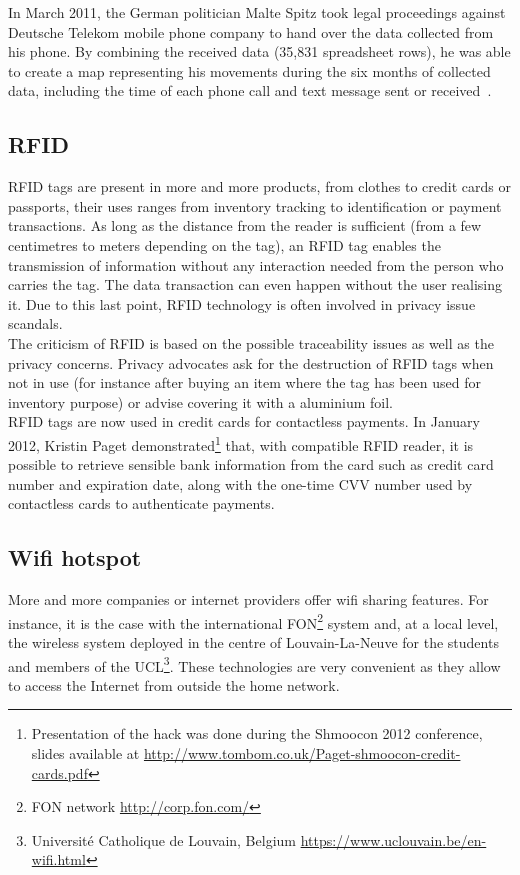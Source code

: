 In March 2011, the German politician Malte Spitz took legal proceedings against Deutsche Telekom mobile phone company to hand over the data collected from his phone.
By combining the received data (35,831 spreadsheet rows), he was able to create a map representing his movements during the six months of collected data, including the time of each phone call and text message sent or received~\cite{german-phone-tracking}.

\subsection*{RFID}

RFID tags are present in more and more products, from clothes to credit cards or passports, their uses ranges from inventory tracking to identification or payment transactions.
As long as the distance from the reader is sufficient (from a few centimetres to meters depending on the tag), an RFID tag enables the transmission of information without any interaction needed from the person who carries the tag.
The data transaction can even happen without the user realising it.
Due to this last point, RFID technology is often involved in privacy issue scandals.\\

The criticism of RFID is based on the possible traceability issues as well as the privacy concerns.
Privacy advocates ask for the destruction of RFID tags when not in use (for instance after buying an item where the tag has been used for inventory purpose) or advise covering it with a aluminium foil.\\

RFID tags are now used in credit cards for contactless payments.
In January 2012, Kristin Paget demonstrated\footnote{Presentation of the hack was done during the Shmoocon 2012 conference, slides available at \url{http://www.tombom.co.uk/Paget-shmoocon-credit-cards.pdf}} that, with compatible RFID reader, it is possible to retrieve sensible bank information from the card such as credit card number and expiration date, along with the one-time CVV number used by contactless cards to authenticate payments.

\subsection*{Wifi hotspot}

More and more companies or internet providers offer wifi sharing features.
For instance, it is the case with the international FON\footnote{FON network \url{http://corp.fon.com/}} system and, at a local level, the wireless system deployed in the centre of Louvain-La-Neuve for the students and members of the UCL\footnote{Université Catholique de Louvain, Belgium \url{https://www.uclouvain.be/en-wifi.html}}.
These technologies are very convenient as they allow to access the Internet from outside the home network.\\

